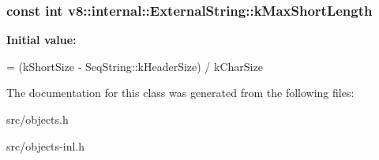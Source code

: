 \subsubsection[{k\+Max\+Short\+Length}]{\setlength{\rightskip}{0pt plus 5cm}const int v8\+::internal\+::\+External\+String\+::k\+Max\+Short\+Length\hspace{0.3cm}{\ttfamily [static]}}\label{classv8_1_1internal_1_1_external_string_a30d05419acd085c38505ab284e04e69b}
{\bfseries Initial value\+:}
\begin{DoxyCode}
=
      (kShortSize - SeqString::kHeaderSize) / kCharSize
\end{DoxyCode}


The documentation for this class was generated from the following files\+:\begin{DoxyCompactItemize}
\item 
src/objects.\+h\item 
src/objects-\/inl.\+h\end{DoxyCompactItemize}
